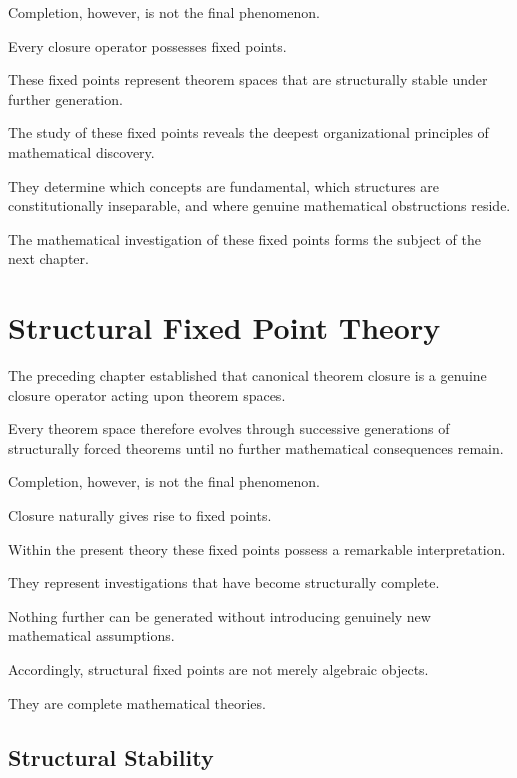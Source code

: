 \documentclass[13pt,openany]{book}
\theoremstyle{plain}
\theoremstyle{definition}
\begin{document}
Completion, however, is not the final phenomenon.

Every closure operator possesses fixed points.

These fixed points represent theorem spaces that are structurally stable under
further generation.

The study of these fixed points reveals the deepest organizational principles
of mathematical discovery.

They determine which concepts are fundamental, which structures are
constitutionally inseparable, and where genuine mathematical obstructions
reside.

The mathematical investigation of these fixed points forms the subject of the
next chapter.

\chapter{Structural Fixed Point Theory}

The preceding chapter established that canonical theorem closure is a genuine
closure operator acting upon theorem spaces.

Every theorem space therefore evolves through successive generations of
structurally forced theorems until no further mathematical consequences remain.

Completion, however, is not the final phenomenon.

Closure naturally gives rise to fixed points.

Within the present theory these fixed points possess a remarkable
interpretation.

They represent investigations that have become structurally complete.

Nothing further can be generated without introducing genuinely new
mathematical assumptions.

Accordingly, structural fixed points are not merely algebraic objects.

They are complete mathematical theories.

\section{Structural Stability}
\end{document}
